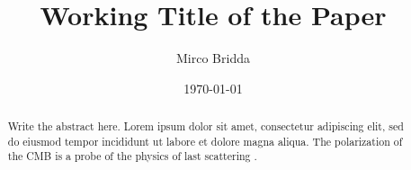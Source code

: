 \documentclass[10pt,twocolumn]{article}
\title{Working Title of the Paper}
\author[1]{Mirco Bridda}
\affil[1]{Department of Physics, University of Padova, Padova, Italy}
\date{\today}
\newif\ifwide
\newcommand{\abstracttext}{%
  Write the abstract here. Lorem ipsum dolor sit amet, consectetur adipiscing
  elit, sed do eiusmod tempor incididunt ut labore et dolore magna aliqua.
  The polarization of the CMB is a probe of the physics of last scattering
  \cite{HW97}.%
}
\begin{document}
  \makeatletter
  \ifwide
    \twocolumn[
      \begin{@twocolumnfalse}
        \maketitle
        \begin{abstract}\abstracttext\end{abstract}
        \vspace{1.5em}
      \end{@twocolumnfalse}
    ]
  \else
    \maketitle
    \begin{abstract}\abstracttext\end{abstract}
  \fi
  \makeatother


  
  
  
  

  \printbibliography
\end{document}
